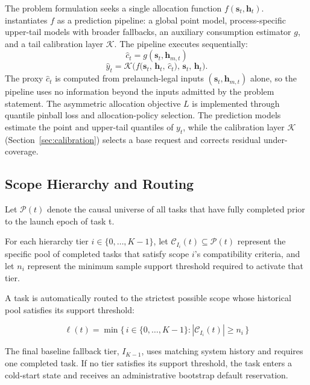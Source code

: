 The problem formulation seeks a single allocation function
$f(\mathbf{s}_t, \mathbf{h}_t)$. \toolname{} instantiates $f$ as a prediction
pipeline: a global point model, process-specific upper-tail models with broader
fallbacks, an auxiliary consumption estimator $g$, and a tail calibration
layer $\mathcal{K}$. The pipeline executes sequentially:
\begin{equation}
\hat{c}_t = g(\mathbf{s}_t, \mathbf{h}_{m,t})
\label{eq:proxy_consumption}
\end{equation}
\begin{equation}
\hat{y}_t = \mathcal{K}\Big( f\big(\mathbf{s}_t,\,
\mathbf{h}_t,\, \hat{c}_t\big),\,\mathbf{s}_t,\,\mathbf{h}_t \Big).
\label{eq:final_allocation}
\end{equation}
The proxy $\hat{c}_t$ is computed from prelaunch-legal inputs
$(\mathbf{s}_t, \mathbf{h}_{m,t})$ alone, so the pipeline uses no
information beyond the inputs admitted by the problem statement. The
asymmetric allocation objective $L$ is implemented through quantile pinball
loss and allocation-policy selection. The prediction models estimate the
point and upper-tail quantiles of $y_t$, while the calibration layer
$\mathcal{K}$ (Section~\ref{sec:calibration}) selects a base request and
corrects residual under-coverage.

\subsection{Scope Hierarchy and Routing}

Let $\mathcal{P}(t)$ denote the causal universe of all tasks that have fully completed prior to the launch epoch of task t. 

For each hierarchy tier $i \in \{0, \dots, K-1\}$, let $\mathcal{C}_{I_i}(t) \subseteq \mathcal{P}(t)$ represent the specific pool of completed tasks that satisfy scope $i$'s compatibility criteria, and let $n_i$ represent the minimum sample support threshold required to activate that tier.

A task is automatically routed to the strictest possible scope whose historical pool satisfies its support threshold:

\begin{equation} 
\ell(t) = \min\big\{\, i \in \{0,\dots,K-1\} : |\mathcal{C}_{I_i}(t)| \ge n_i \,\big\} \label{eq:routing_logic} \end{equation}

The final baseline fallback tier, $I_{K-1}$, uses matching system history and requires one completed task. If no tier satisfies its support threshold, the task enters a cold-start state and receives an administrative bootstrap default reservation.

